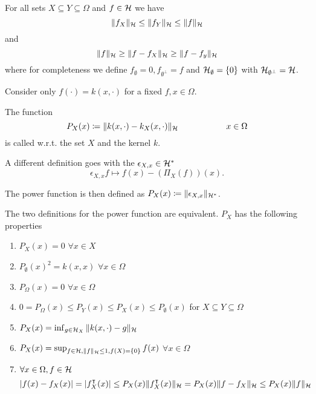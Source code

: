 \begin{corollary}\label{cor:1.20}
    For all sets $X\subseteq Y\subseteq \Omega$ and $f\in \mathcal{H}$ we have 
    \[\Vert f_X\Vert_{\mathcal{H}}\leq \Vert f_Y\Vert_{\mathcal{H}} \leq \Vert f\Vert_{\mathcal{H}}\]
    and 
    \[\Vert f\Vert_{\mathcal{H}}\geq \Vert f-f_X\Vert_{\mathcal{H}}\geq\Vert f-f_y\Vert_{\mathcal{H}}\]
    where for completeness we define $f_\emptyset=0,f_{\emptyset^\perp}=f$ and 
    $\mathcal{H}_{\emptyset}=\{0\}$ with $\mathcal{H}_{\emptyset^\perp}=\mathcal{H}$.
\end{corollary}



Consider only $f(\cdot)=k(x,\cdot)$ for a fixed $f,x\in\Omega$.

\begin{definition}\label{def:2.1:power_function}
    The function \[P_X(x)\coloneqq \Vert k(x,\cdot)-k_X(x,\cdot)\Vert_{\mathcal{H}}\hspace{2cm} x\in\Omega\]
    is called  w.r.t. the set $X$ and the kernel $k$.

    A different definition goes with the  $\epsilon_{X,x}\in\mathcal{H}^*$
    \[\epsilon_{X,x} f\mapsto f(x)-(\Pi_X(f))(x).\]

    The power function is then defined as $P_X(x)\coloneqq \Vert \epsilon_{X,x}\Vert_{\mathcal{H}^*}$.
\end{definition}

\begin{theorem}\label{thm:2.2}
    The two definitions for the power function are equivalent. 
    $P_X$ has the following properties
    \begin{enumerate}
        \item $P_X(x)=0$ $\forall x\in X$
        \item $P_\emptyset(x)^2=k(x,x)$ $\forall x\in \Omega$
        \item $P_\Omega(x)=0$ $\forall x\in\Omega$
        \item $0=P_\Omega(x)\leq P_Y(x)\leq P_X(x)\leq P_\emptyset(x)$ for $X\subseteq Y\subseteq \Omega$
        \item $P_X(x)=\inf_{g\in\mathcal{H}_X} \Vert k(x,\cdot)-g\Vert_{\mathcal{H}}$ 
        \item $P_X(x)=\sup_{f\in\mathcal{H},\Vert f\Vert_{\mathcal{H}} \leq 1,f(X)=\{0\}} f(x)$ $\forall x\in\Omega$
        \item $\forall x\in \Omega,f\in\mathcal{H}$\[|f(x)-f_X(x)|=\vert f_X^\intercal(x)\vert\leq P_X(x)\Vert f_X^\intercal(x)\Vert_{\mathcal{H}}= P_X(x)\Vert f-f_X\Vert_{\mathcal{H}}\leq P_X(x)\Vert f\Vert_{\mathcal{H}}\]
    \end{enumerate}
\end{theorem}

